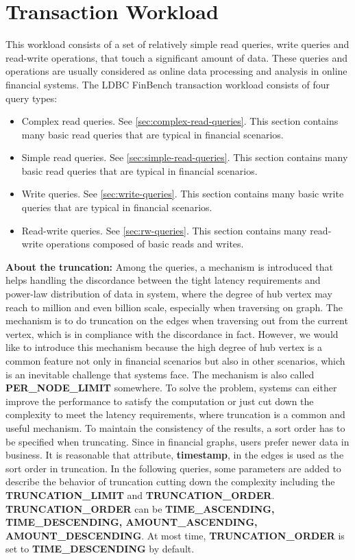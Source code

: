 \chapter{Transaction Workload}
\label{sec:transaction-workload}

This workload consists of a set of relatively simple read queries, write queries
and read-write operations, that touch a significant amount of data. These
queries and operations are usually considered as online data processing and
analysis in online financial systems. The LDBC FinBench transaction workload
consists of four query types:
\begin{itemize}
    \item Complex read queries. See \autoref{sec:complex-read-queries}. This
          section contains many basic read queries that are typical in financial
          scenarios.
    \item Simple read queries. See \autoref{sec:simple-read-queries}. This
          section contains many basic read queries that are typical in financial
          scenarios.
    \item Write queries. See \autoref{sec:write-queries}. This section contains
          many basic write queries that are typical in financial scenarios.
    \item Read-write queries. See \autoref{sec:rw-queries}. This section
          contains many read-write operations composed of basic reads and writes.
\end{itemize}

{\flushleft \textbf{About the truncation:}} Among the queries, a mechanism is
introduced that helps handling the discordance between the tight latency requirements
and power-law distribution of data in system, where the degree of hub vertex may
reach to million and even billion scale, especially when traversing on graph.
The mechanism is to do truncation on the edges when traversing out from the
current vertex, which is in compliance with the discordance in fact. However, we
would like to introduce this mechanism because the high degree of hub vertex is
a common feature not only in financial scenarios but also in other scenarios,
which is an inevitable challenge that systems face. The mechanism is also called
\textbf{PER\_NODE\_LIMIT} somewhere. To solve the problem, systems can either
improve the performance to satisfy the computation or just cut down the
complexity to meet the latency requirements, where truncation is a common and
useful mechanism. To maintain the consistency of the results, a sort order has
to be specified when truncating. Since in financial graphs, users prefer newer
data in business. It is reasonable that attribute, \textbf{timestamp}, in the
edges is used as the sort order in truncation. In the following queries, some
parameters are added to describe the behavior of truncation cutting down the
complexity including the \textbf{TRUNCATION\_LIMIT} and \textbf{TRUNCATION\_ORDER}.
\textbf{TRUNCATION\_ORDER} can be \textbf{TIME\_ASCENDING, TIME\_DESCENDING,
AMOUNT\_ASCENDING, AMOUNT\_DESCENDING}. At most time, \textbf{TRUNCATION\_ORDER}
is set to \textbf{TIME\_DESCENDING} by default.

